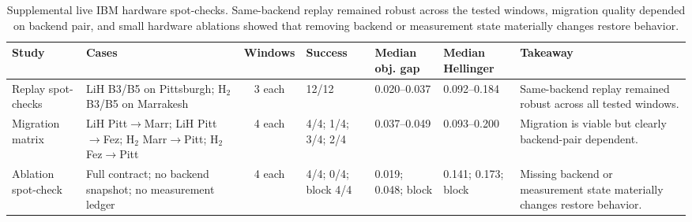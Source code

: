\begin{table}[t]
\centering
\footnotesize
\renewcommand{\arraystretch}{0.9}
\setlength{\tabcolsep}{3.5pt}
\begin{tabularx}{\columnwidth}{p{}Xc p{} p{} p{} X}
\toprule
\textbf{Study} & \textbf{Cases} & \textbf{Windows} & \textbf{Success} & \textbf{Median obj. gap} & \textbf{Median Hellinger} & \textbf{Takeaway} \\
\midrule
Replay spot-checks & LiH B3/B5 on Pittsburgh; H$_2$ B3/B5 on Marrakesh & 3 each & 12/12 & 0.020--0.037 & 0.092--0.184 & Same-backend replay remained robust across all tested windows. \\
Migration matrix & LiH Pitt$\rightarrow$Marr; LiH Pitt$\rightarrow$Fez; H$_2$ Marr$\rightarrow$Pitt; H$_2$ Fez$\rightarrow$Pitt & 4 each & 4/4; 1/4; 3/4; 2/4 & 0.037--0.049 & 0.093--0.200 & Migration is viable but clearly backend-pair dependent. \\
Ablation spot-check & Full contract; no backend snapshot; no measurement ledger & 4 each & 4/4; 0/4; block 4/4 & 0.019; 0.048; block & 0.141; 0.173; block & Missing backend or measurement state materially changes restore behavior. \\
\bottomrule
\end{tabularx}
\caption{Supplemental live IBM hardware spot-checks. Same-backend replay remained robust across the tested windows, migration quality depended on backend pair, and small hardware ablations showed that removing backend or measurement state materially changes restore behavior.}
\label{tab:supplemental_hw_spotchecks}
\end{table}
